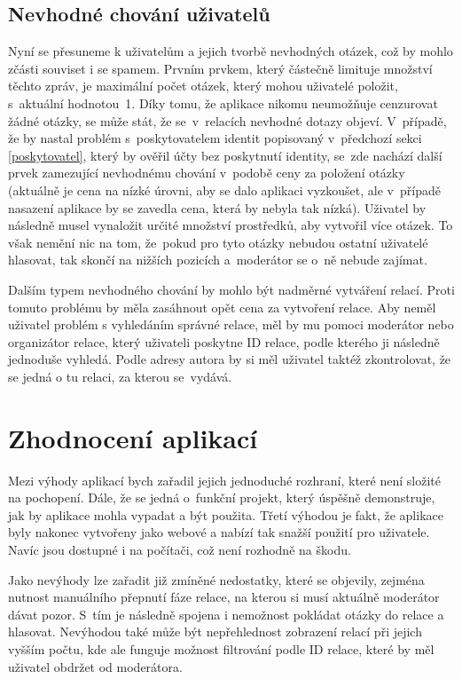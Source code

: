 \subsection{Nevhodné chování uživatelů}
\label{nevhodne}
Nyní se přesuneme k uživatelům a jejich tvorbě nevhodných otázek, což by mohlo zčásti souviset i se spamem. Prvním prvkem, který částečně limituje množství těchto zpráv, je maximální počet otázek, který mohou uživatelé položit, s~aktuální hodnotou~1. Díky tomu, že aplikace nikomu neumožňuje cenzurovat žádné otázky, se může stát, že se~v~relacích nevhodné dotazy objeví. V~případě, že by nastal problém s~poskytovatelem identit popisovaný v~předchozí sekci \ref{poskytovatel}, který by ověřil účty bez poskytnutí identity, se~zde nachází další prvek zamezující nevhodnému chování v~podobě ceny za položení otázky (aktuálně je cena na nízké úrovni, aby se dalo aplikaci vyzkoušet, ale v~případě nasazení aplikace by se zavedla cena, která by nebyla tak nízká). Uživatel by následně musel vynaložit určité množství prostředků, aby vytvořil více otázek. To však nemění nic na tom, že~pokud pro tyto otázky nebudou ostatní uživatelé hlasovat, tak skončí na nižších pozicích a~moderátor se o~ně nebude zajímat. 

Dalším typem nevhodného chování by mohlo být nadměrné vytváření relací. Proti tomuto problému by měla zasáhnout opět cena za vytvoření relace. Aby neměl uživatel problém s vyhledáním správné relace, měl by mu pomoci moderátor nebo organizátor relace, který uživateli poskytne ID relace, podle kterého ji následně jednoduše vyhledá. Podle adresy autora by si měl uživatel taktéž zkontrolovat, že se jedná o tu relaci, za kterou se~vydává.

\section{Zhodnocení aplikací}
Mezi výhody aplikací bych zařadil jejich jednoduché rozhraní, které není složité na pochopení. Dále, že se jedná o~funkční projekt, který úspěšně demonstruje, jak by aplikace mohla vypadat a být použita. Třetí výhodou je fakt, že aplikace byly nakonec vytvořeny jako webové a nabízí tak snažší použití pro uživatele. Navíc jsou dostupné i na počítači, což není rozhodně na škodu. 

Jako nevýhody lze zařadit již zmíněné nedostatky, které se objevily, zejména nutnost manuálního přepnutí fáze relace, na kterou si musí aktuálně moderátor dávat pozor. S~tím je následně spojena i nemožnost pokládat otázky do relace a hlasovat. Nevýhodou také může být nepřehlednost zobrazení relací při jejich vyšším počtu, kde ale funguje možnost filtrování podle ID relace, které by měl uživatel obdržet od moderátora.

